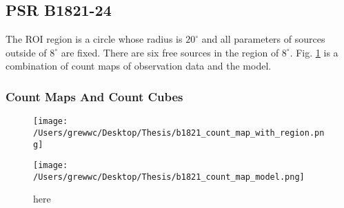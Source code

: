 \documentclass[12pt]{report}
\newcommand{\mycaption}[1]{\protect \caption{#1}}
\newcommand{\singleFig}[3]{
 \begin{figure}[!ht]
  \centering
  \texttt{[image: /Users/grewwc/Desktop/Thesis/\#1]}
  \mycaption{#3}
 \label{fig: #1}
 \end{figure}
}
\newcommand{\Notice}[1]{
  $<$\textbf{Notice}$>$#1$<$\textbf{/Notice}$>$
}
\begin{document}

            \subsection{PSR B1821-24}
              The ROI region is a circle whose radius is $20^\circ$ and all 
              parameters of sources outside of $8^\circ$ are fixed. 
              There are six free sources in the region of $8^\circ$. Fig.
              \ref{fig: b1821_count_map_with_region_and_model} 
              is a combination of count maps of observation data and the model. 

              \subsubsection{Count Maps And Count Cubes}
                \begin{figure}[!ht]
                  \begin{center}
                  \begin{minipage}{0.45\textwidth}
                    \begin{center} 
                      \texttt{[image: /Users/grewwc/Desktop/Thesis/b1821\_count\_map\_with\_region.png]}
                    \end{center}
                  \end{minipage}
                  \begin{minipage}{0.45\textwidth}
                    \begin{center}
                      \texttt{[image: /Users/grewwc/Desktop/Thesis/b1821\_count\_map\_model.png]}
                    \end{center}
                  \end{minipage}
                \end{center}
              \caption{here}
                
                \label{fig: b1821_count_map_with_region_and_model}
              \end{figure}
            
\end{document}
